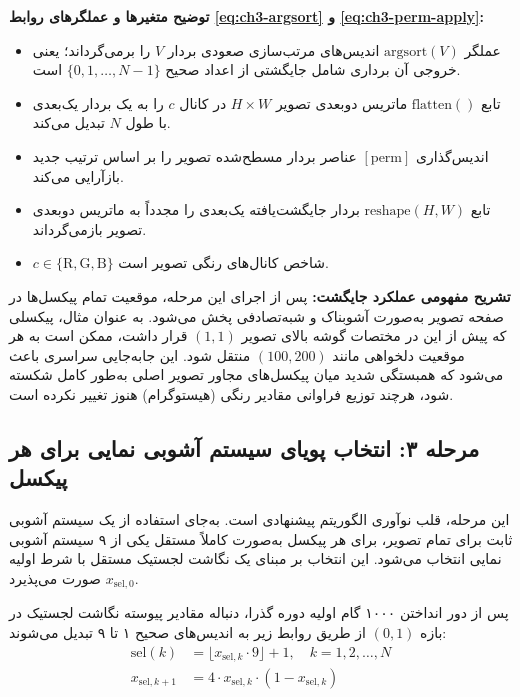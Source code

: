 \textbf{توضیح متغیرها و عملگرهای روابط \eqref{eq:ch3-argsort} و \eqref{eq:ch3-perm-apply}:}
\begin{itemize}
    \item عملگر $\mathrm{argsort}(V)$ اندیس‌های مرتب‌سازی صعودی بردار $V$ را برمی‌گرداند؛ یعنی خروجی آن برداری شامل جایگشتی از اعداد صحیح $\{0, 1, \dots, N-1\}$ است.
    \item تابع $\mathrm{flatten()}$ ماتریس دوبعدی تصویر $H \times W$ در کانال $c$ را به یک بردار یک‌بعدی با طول $N$ تبدیل می‌کند.
    \item اندیس‌گذاری $[\mathrm{perm}]$ عناصر بردار مسطح‌شده تصویر را بر اساس ترتیب جدید بازآرایی می‌کند.
    \item تابع $\mathrm{reshape}(H, W)$ بردار جایگشت‌یافته یک‌بعدی را مجدداً به ماتریس دوبعدی تصویر بازمی‌گرداند.
    \item $c \in \{\mathrm{R}, \mathrm{G}, \mathrm{B}\}$ شاخص کانال‌های رنگی تصویر است.
\end{itemize}

\textbf{تشریح مفهومی عملکرد جایگشت:}
پس از اجرای این مرحله، موقعیت تمام پیکسل‌ها در صفحه تصویر به‌صورت آشوبناک و شبه‌تصادفی پخش می‌شود. به عنوان مثال، پیکسلی که پیش از این در مختصات گوشه بالای تصویر $(1, 1)$ قرار داشت، ممکن است به هر موقعیت دلخواهی مانند $(100, 200)$ منتقل شود. این جابه‌جایی سراسری باعث می‌شود که همبستگی شدید میان پیکسل‌های مجاور تصویر اصلی به‌طور کامل شکسته شود، هرچند توزیع فراوانی مقادیر رنگی (هیستوگرام) هنوز تغییر نکرده است.

\subsection{مرحله ۳: انتخاب پویای سیستم آشوبی نمایی برای هر پیکسل}

این مرحله، قلب نوآوری الگوریتم پیشنهادی است. به‌جای استفاده از یک سیستم آشوبی ثابت برای تمام تصویر، برای هر پیکسل به‌صورت کاملاً مستقل یکی از ۹ سیستم آشوبی نمایی انتخاب می‌شود. این انتخاب بر مبنای یک نگاشت لجستیک مستقل با شرط اولیه $x_{\mathrm{sel},0}$ صورت می‌پذیرد.

پس از دور انداختن ۱۰۰۰ گام اولیه دوره گذرا، دنباله مقادیر پیوسته نگاشت لجستیک در بازه $(0, 1)$ از طریق روابط زیر به اندیس‌های صحیح ۱ تا ۹ تبدیل می‌شوند:
\begin{align}
\mathrm{sel}(k) &= \lfloor x_{\mathrm{sel},k} \cdot 9 \rfloor + 1, \quad k=1,2,\ldots,N \label{eq:ch3-sel-index} \\
x_{\mathrm{sel},k+1} &= 4 \cdot x_{\mathrm{sel},k} \cdot (1 - x_{\mathrm{sel},k}) \label{eq:ch3-sel-logistic}
\end{align}

